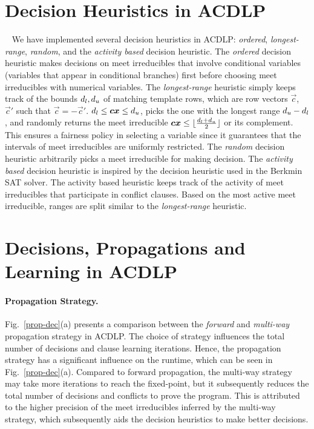 \section{Decision Heuristics in ACDLP}~\label{decision}
%
We have implemented several decision heuristics in ACDLP: {\em ordered}, 
{\em longest-range}, {\em random}, and the {\em activity based} 
decision heuristic.  The {\em ordered} decision heuristic 
makes decisions on meet irreducibles that involve conditional 
variables (variables that appear in conditional branches) first 
before choosing meet irreducibles with numerical variables.  
%
The {\em longest-range} heuristic simply keeps track of the bounds
$d_l,d_u$ of matching template rows, which are 
row vectors $\vec{c}$, $\vec{c}'$ such that $\vec{c}=-\vec{c}'$.
$d_l\leq {\boldsymbol c}{\boldsymbol x}\leq d_u$, picks the one with the longest range
$d_u-d_l$, and randomly returns the meet irreducible
${\boldsymbol c}{\boldsymbol x}\leq
\lfloor\frac{d_l+d_u}{2}\rfloor$ or its
complement. This ensures a fairness policy in selecting a variable
since it guarantees that the intervals of meet irreducibles are
uniformly restricted.
%
The {\em random} decision heuristic arbitrarily picks a meet irreducible  
for making decision. 
%
%
The {\em activity based} decision heuristic is inspired by the 
decision heuristic used in the Berkmin SAT solver.  
The activity based heuristic %
keeps track of the activity of meet irreducibles that 
participate in conflict clauses.  Based on the most 
active meet irreducible, ranges are split similar to 
the {\em longest-range} heuristic.
%
\section{Decisions, Propagations and Learning in ACDLP}
%

%
\paragraph{Propagation Strategy.}
%
Fig.~\ref{prop-dec}(a) presents a comparison between the {\em forward} 
and {\em multi-way} propagation strategy in ACDLP.  The
choice of strategy influences the total number of decisions and clause 
learning iterations.  Hence, the propagation strategy has a
significant influence on the runtime, which can be seen in
Fig.~\ref{prop-dec}(a).  Compared to forward propagation, the multi-way
strategy may take more iterations to reach the fixed-point, but it
subsequently reduces the total number of decisions and conflicts to prove the
program.  This is attributed to the higher precision of the meet irreducibles 
inferred by the multi-way strategy, which subsequently aids the decision 
heuristics to make better decisions.

